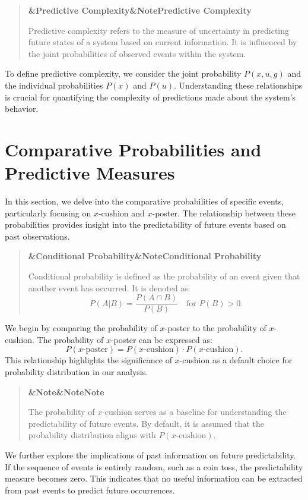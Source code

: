 \documentclass[a4paper]{article}
\newcommand{\boxheading}[1]{%
  \par\smallskip
  \noindent\textbf{\ifx&#1&Note\else#1\fi}\par
  \smallskip
}
\newenvironment{defbox}[1][]{%
  \begin{quote}\color{green!40!black}\boxheading{#1}\normalcolor
}{\end{quote}}
\newenvironment{rembox}[1][]{%
  \begin{quote}\color{black!70}\boxheading{#1}\normalcolor
}{\end{quote}}
\begin{document}
\begin{defbox}[Predictive Complexity]
Predictive complexity refers to the measure of uncertainty in predicting future states of a system based on current information. It is influenced by the joint probabilities of observed events within the system.
\end{defbox}

To define predictive complexity, we consider the joint probability \( P(x, u, g) \) and the individual probabilities \( P(x) \) and \( P(u) \). Understanding these relationships is crucial for quantifying the complexity of predictions made about the system's behavior.

\section{Comparative Probabilities and Predictive Measures}
In this section, we delve into the comparative probabilities of specific events, particularly focusing on \( x \)-cushion and \( x \)-poster. The relationship between these probabilities provides insight into the predictability of future events based on past observations.

\begin{defbox}[Conditional Probability]
Conditional probability is defined as the probability of an event given that another event has occurred. It is denoted as:
\[
P(A|B) = \frac{P(A \cap B)}{P(B)} \quad \text{for } P(B) > 0.
\]
\end{defbox}

We begin by comparing the probability of \( x \)-poster to the probability of \( x \)-cushion. The probability of \( x \)-poster can be expressed as:
\[
P(x\text{-poster}) = P(x\text{-cushion}) \cdot P(x\text{-cushion}).
\]
This relationship highlights the significance of \( x \)-cushion as a default choice for probability distribution in our analysis.

\begin{rembox}[Note]
The probability of \( x \)-cushion serves as a baseline for understanding the predictability of future events. By default, it is assumed that the probability distribution aligns with \( P(x\text{-cushion}) \).
\end{rembox}

We further explore the implications of past information on future predictability. If the sequence of events is entirely random, such as a coin toss, the predictability measure becomes zero. This indicates that no useful information can be extracted from past events to predict future occurrences.
\end{document}
